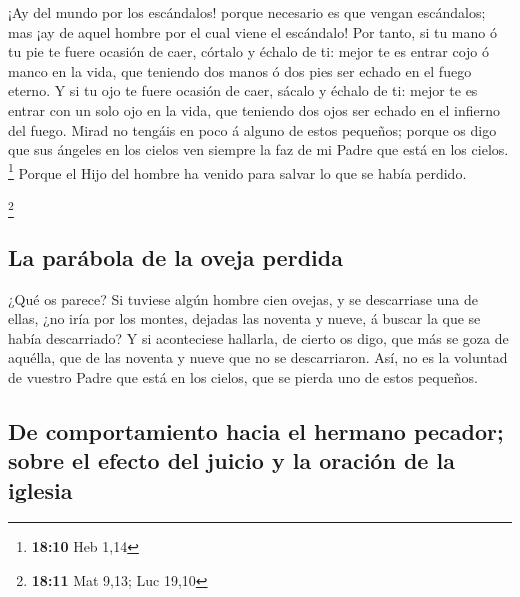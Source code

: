  ¡Ay del mundo por los escándalos! porque necesario es que
vengan escándalos; mas ¡ay de aquel hombre por el cual viene el
escándalo!  Por tanto, si tu mano ó tu pie te fuere
ocasión de caer, córtalo y échalo de ti: mejor te es entrar cojo ó manco
en la vida, que teniendo dos manos ó dos pies ser echado en el fuego
eterno.  Y si tu ojo te fuere ocasión de caer, sácalo y
échalo de ti: mejor te es entrar con un solo ojo en la vida, que
teniendo dos ojos ser echado en el infierno del fuego. 
Mirad no tengáis en poco á alguno de estos pequeños; porque os digo que
sus ángeles en los cielos ven siempre la faz de mi Padre que está en los
cielos. \footnote{\textbf{18:10} Heb 1,14}  Porque el
Hijo del hombre ha venido para salvar lo que se había perdido.

\footnote{\textbf{18:11} Mat 9,13; Luc 19,10}

\hypertarget{la-paruxe1bola-de-la-oveja-perdida}{%
\subsection{La parábola de la oveja
perdida}\label{la-paruxe1bola-de-la-oveja-perdida}}

 ¿Qué os parece? Si tuviese algún hombre cien ovejas, y
se descarriase una de ellas, ¿no iría por los montes, dejadas las
noventa y nueve, á buscar la que se había descarriado?  Y
si aconteciese hallarla, de cierto os digo, que más se goza de aquélla,
que de las noventa y nueve que no se descarriaron.  Así,
no es la voluntad de vuestro Padre que está en los cielos, que se pierda
uno de estos pequeños.

\hypertarget{de-comportamiento-hacia-el-hermano-pecador-sobre-el-efecto-del-juicio-y-la-oraciuxf3n-de-la-iglesia}{%
\subsection{De comportamiento hacia el hermano pecador; sobre el efecto
del juicio y la oración de la
iglesia}\label{de-comportamiento-hacia-el-hermano-pecador-sobre-el-efecto-del-juicio-y-la-oraciuxf3n-de-la-iglesia}}


